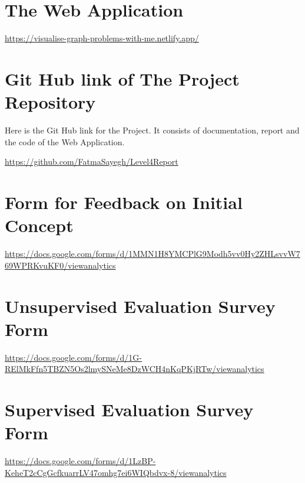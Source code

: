 
\section{The Web Application}
\href{https://visualise-graph-problems-with-me.netlify.app/} 
{https://visualise-graph-problems-with-me.netlify.app/}

\section{Git Hub link of The Project Repository}
\label{links: repository}
Here is the Git Hub link for the Project. It consists of documentation, report and the
code of the Web Application.

\href{https://github.com/FatmaSayegh/Level4Report} {https://github.com/FatmaSayegh/Level4Report}

\section{Form for Feedback on Initial Concept}
\label{links: initialConcept}
\href{https://docs.google.com/forms/d/1MMN1H8YMCPlG9Modh5vv0Hy2ZHLsvvW769WPRKvuKF0/viewanalytics} {https://docs.google.com/forms/d/1MMN1H8YMCPlG9Modh5vv0Hy2ZHLsvvW769WPRKvuKF0/viewanalytics}

\section{Unsupervised Evaluation Survey Form}
\label{links: unsupervised}
\href{https://docs.google.com/forms/d/1G-RElMkFfn5TBZN5Os2lmySNeMe8DzWCH4nKqPKjRTw/viewanalytics} {https://docs.google.com/forms/d/1G-RElMkFfn5TBZN5Os2lmySNeMe8DzWCH4nKqPKjRTw/viewanalytics}

\section{Supervised Evaluation Survey Form}
\label{links: supervised}
\href{https://docs.google.com/forms/d/1LzBP-KeheT2cCgGcfkuarrLV47omhg7ei6WIQbdvx-8/viewanalytics} {https://docs.google.com/forms/d/1LzBP-KeheT2cCgGcfkuarrLV47omhg7ei6WIQbdvx-8/viewanalytics}
